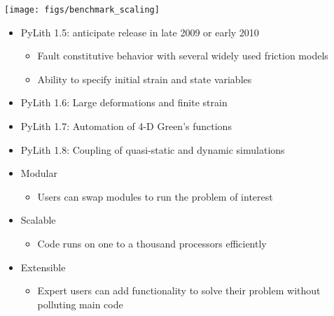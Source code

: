 \documentclass[pdftex,cig,slideColor]{pp4slides}
\begin{document}

  \vfill
  \begin{center}
    \texttt{[image: figs/benchmark\_scaling]}
  \end{center}
  \vfill


  \begin{itemize}
  \item PyLith 1.5: anticipate release in late 2009 or early 2010
    \begin{itemize}
    \item Fault constitutive behavior with several widely used friction models
    \item Ability to specify initial strain and state variables
    \end{itemize}
  \item PyLith 1.6: Large deformations and finite strain
  \item PyLith 1.7: Automation of 4-D Green's functions
  \item PyLith 1.8: Coupling of quasi-static and dynamic simulations
  \end{itemize}
  
  
  \begin{itemize}
  \item Modular
    \begin{itemize}
    \item Users can swap modules to run the problem of interest
    \end{itemize}
  \item Scalable
    \begin{itemize}
    \item Code runs on one to a thousand processors efficiently
    \end{itemize}    
  \item Extensible
    \begin{itemize}
    \item Expert users can add functionality to solve their problem
      without polluting main code
    \end{itemize}
  \end{itemize}
\end{document}
